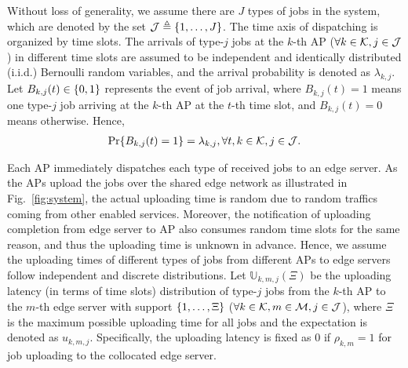 Without loss of generality, we assume there are $J$ types of jobs in the system, which are denoted by the set $\mathcal{J} \triangleq \{1,\dots,J\}$.
The time axis of dispatching is organized by time slots.
The arrivals of type-$j$ jobs at the $k$-th AP ($\forall k\in\mathcal{K},j\in\mathcal{J}$) in different time slots are assumed to be independent and identically distributed (i.i.d.) Bernoulli random variables, and the arrival probability is denoted as $\lambda_{k,j}$.
Let $B_{k,j}(t) \in \{0,1\}$ represents the event of job arrival, where $B_{k,j}(t)=1$ means one type-$j$ job arriving at the $k$-th AP at the $t$-th time slot, and $B_{k,j}(t)=0$ means otherwise.
Hence,
\begin{align}
    \Pr\{ B_{k,j}(t) = 1 \} = \lambda_{k,j}, \forall t,k\in\mathcal{K},j\in\mathcal{J}.
\end{align}

Each AP immediately dispatches each type of received jobs to an edge server.
As the APs upload the jobs over the shared edge network as illustrated in Fig.~\ref{fig:system}, the actual uploading time is random due to random traffics coming from other enabled services.
Moreover, the notification of uploading completion from edge server to AP also consumes random time slots for the same reason, and thus the uploading time is unknown in advance.
Hence, we assume the uploading times of different types of jobs from different APs to edge servers follow independent and discrete distributions.
Let $\mathbb{U}_{k,m,j}(\Xi)$ be the uploading latency (in terms of time slots) distribution of type-$j$ jobs from the $k$-th AP to the $m$-th edge server with support $\{1, \dots, \Xi\}$ ($\forall k\in\mathcal{K}, m\in\mathcal{M}, j\in\mathcal{J}$), where $\Xi$ is the maximum possible uploading time for all jobs and the expectation is denoted as $u_{k,m,j}$.
Specifically, the uploading latency is fixed as $0$ if $\rho_{k,m}=1$ for job uploading to the collocated edge server.

